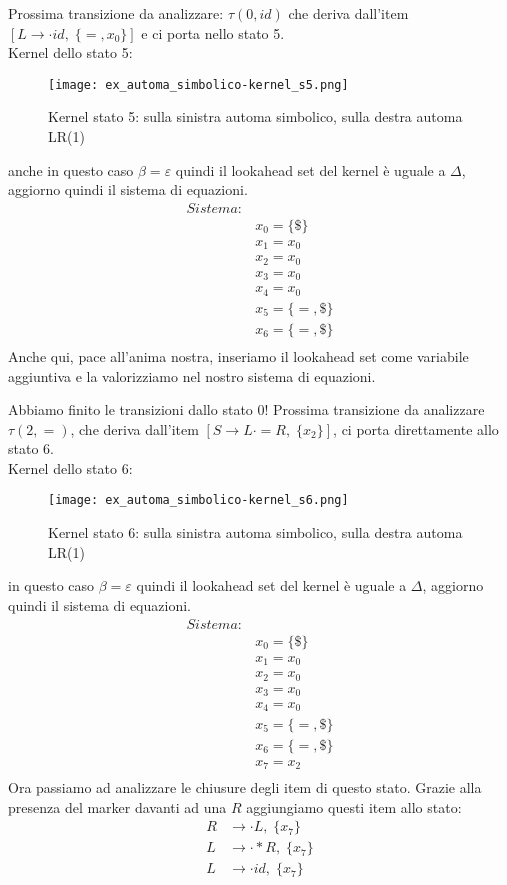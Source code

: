 \documentclass[class=book, crop=false, oneside, 12pt]{standalone}
\begin{document}
Prossima transizione da analizzare: \(\tau(0,id)\) che deriva dall'item \([L \to \cdot id, \; \{=, x_0\}]\) e ci porta nello stato 5.
\\
Kernel dello stato 5:
\begin{figure}[h!]
    \centering
    \texttt{[image: ex\_automa\_simbolico-kernel\_s5.png]}
    \caption{Kernel stato 5: sulla sinistra automa simbolico, sulla destra automa LR(1)}
\end{figure}
anche in questo caso  \(\beta = \varepsilon\) quindi il lookahead set del kernel è uguale a \(\Delta\), aggiorno quindi il sistema di equazioni.
\begin{align*}
    Sistema:& \\
            & x_0 = \{\$\} \\
            & x_1 = x_0 \\
            & x_2 = x_0 \\
            & x_3 = x_0 \\
            & x_4 = x_0 \\
            & x_5 = \{=, \$\} \\
            & x_6 = \{=, \$\} \\
\end{align*}
Anche qui, pace all'anima nostra, inseriamo il lookahead set come variabile aggiuntiva e la valorizziamo nel nostro sistema di equazioni.

Abbiamo finito le transizioni dallo stato 0! Prossima transizione da analizzare \(\tau(2, =)\), che deriva dall'item \([S \to L \cdot = R, \; \{x_2\}]\), ci porta direttamente allo stato 6.
\\
Kernel dello stato 6:
\begin{figure}[h!]
    \centering
    \texttt{[image: ex\_automa\_simbolico-kernel\_s6.png]}
    \caption{Kernel stato 6: sulla sinistra automa simbolico, sulla destra automa LR(1)}
\end{figure}
in questo caso  \(\beta = \varepsilon\) quindi il lookahead set del kernel è uguale a \(\Delta\), aggiorno quindi il sistema di equazioni.
\begin{align*}
    Sistema:& \\
            & x_0 = \{\$\} \\
            & x_1 = x_0 \\
            & x_2 = x_0 \\
            & x_3 = x_0 \\
            & x_4 = x_0 \\
            & x_5 = \{=, \$\} \\
            & x_6 = \{=, \$\} \\
            & x_7 = x_2 \\
\end{align*}
Ora passiamo ad analizzare le chiusure degli item di questo stato.
Grazie alla presenza del marker davanti ad una \(R\) aggiungiamo questi item allo stato:
\begin{align*}
    R &\to \cdot L, \; \{x_7\} \\
    L &\to \cdot *R, \; \{x_7\} \\
    L &\to \cdot id, \; \{x_7\}
\end{align*}
\end{document}
